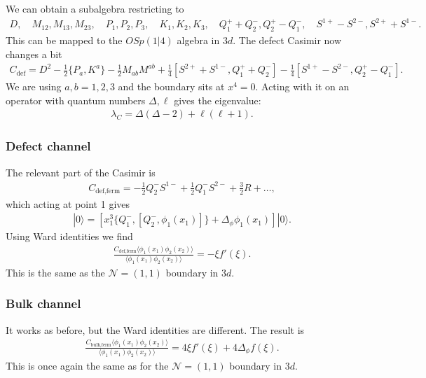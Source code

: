 \documentclass[letterpaper]{article}
\let\Oldsubsubsection\subsubsection
\renewcommand{\subsubsection}{\FloatBarrier\Oldsubsubsection}
\def\Nm{{\mathcal{N}}}
\begin{document}
We can obtain a subalgebra restricting to
\begin{align}
 D, \quad
 M_{12}, M_{13}, M_{23}, \quad
 P_1, P_2, P_3, \quad
 K_1, K_2, K_3, \quad
 Q^+_1 + Q^-_2, Q^+_2 - Q^-_1, \quad
 S^{1+} - S^{2-}, S^{2+} + S^{1-}.
\end{align}
This can be mapped to the $OSp(1|4)$ algebra in $3d$.
The defect Casimir now changes a bit
\begin{align}
 C_{\text{def}} = 
    D^2
  - \frac12 \{ P_{a}, K^{a} \}
  - \frac12 M_{ab} M^{ab}
  + \frac14 [ S^{2+} + S^{1-}, Q^+_1 + Q^-_2]
  - \frac14 [ S^{1+} - S^{2-}, Q^+_2 - Q^-_1].
\end{align}
We are using $a, b = 1, 2, 3$ and the boundary sits at $x^4 = 0$.
Acting with it on an operator with quantum numbers $\Delta, \ell$ gives the eigenvalue:
\begin{align}
 \lambda_C 
 = \Delta (\Delta - 2)
 + \ell(\ell + 1).
\end{align}

\subsubsection{Defect channel}

The relevant part of the Casimir is
\begin{align}
 C_{\text{def,ferm}} = - \frac12 Q_2^- S^{1-} + \frac12 Q_1^- S^{2-} + \frac32 R + \ldots,
\end{align}
which acting at point 1 gives
\begin{align}
 [C_{\text{def,ferm}}, \phi_1(x_1)] |0 \rangle
 = \left[ x_1^3 \{ Q_1^-, [Q_2^-, \phi_1(x_1)] \} + \Delta_\phi \phi_1(x_1)
 \right] | 0 \rangle.
\end{align}
Using Ward identities we find
\begin{align}
 \frac{C_{\text{def,ferm}} \langle \phi_1(x_1) \phi_2(x_2) \rangle}
      {\langle \phi_1(x_1) \phi_2(x_2) \rangle}
 = - \xi  f'(\xi ).
\end{align}
This is the same as the $\Nm = (1, 1)$ boundary in $3d$.

\subsubsection{Bulk channel}

It works as before, but the Ward identities are different. The result is
\begin{align}
 \frac{C_{\text{bulk,ferm}} \langle \phi_1(x_1) \phi_2(x_2) \rangle}
      {\langle \phi_1(x_1) \phi_2(x_2) \rangle}
 = 4 \xi  f'(\xi )
 + 4 \Delta_\phi f(\xi ).
\end{align}
This is once again the same as for the $\Nm = (1, 1)$ boundary in $3d$.
\end{document}
